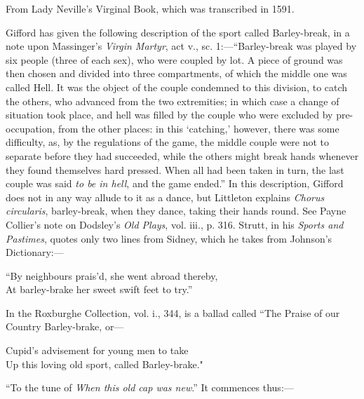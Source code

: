 
From Lady Neville's Virginal Book, which was transcribed in 1591.



\pagebreak

Gifford has given the following description of the sport called Barley-break, in
a note upon Massinger’s \textit{Virgin Martyr}, act v., sc. 1:—“Barley-break was
played by six people
 (three of each sex), who were coupled by lot. A piece of
ground was then chosen and divided into three compartments, of which the middle
one was called Hell. It was the object of the couple condemned to this division,
to catch the others, who advanced from the two extremities; in which case a
change of situation took place, and hell was filled by the couple who were excluded
by pre-occupation, from the other places: in this ‘catching,’ however, there was
some difficulty, as, by the regulations of the game, the middle couple were not
to separate before they had succeeded, while the others might break hands whenever
they found themselves hard pressed. When all had been taken in turn, the
last couple was said \textit{to be in hell}, and the game ended.” In this description,
Gifford does not in any way allude to it as a dance, but Littleton explains \textit{Chorus
circularis}, barley-break, when they dance, taking their hands round. See Payne
Collier’s note on Dodsley’s \textit{Old Plays}, vol. iii., p. 316. Strutt, in his \textit{Sports and
Pastimes}, quotes only two lines from Sidney, which he takes from Johnson’s
Dictionary:—
\begin{scverse}
“By neighbours prais’d, she went abroad thereby,\\
At barley-brake her sweet swift feet to try.”
\end{scverse}
In the Roxburghe Collection, vol. i., 344, is a ballad called “The Praise of our
Country Barley-brake, or—
\begin{scverse}
Cupid’s advisement for young men to take\\
Up this loving old sport, called Barley-brake."
\end{scverse}
“To the tune of \textit{When this old cap was new}.” It commences thus:—
